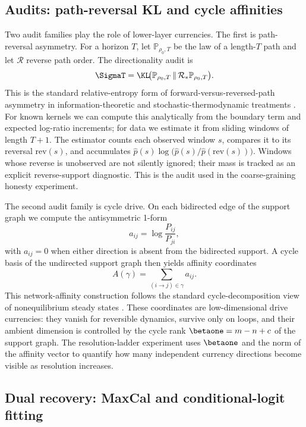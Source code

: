 \subsection{Audits: path-reversal KL and cycle affinities}

Two audit families play the role of lower-layer currencies. The first is path-reversal asymmetry. For a horizon \(T\), let \(\mathbb{P}_{\rho_0,T}\) be the law of a length-\(T\) path and let \(\mathcal R\) reverse path order. The directionality audit is
\[
\SigmaT = \KL\!\big(\mathbb{P}_{\rho_0,T}\,\|\,\mathcal R_*\mathbb{P}_{\rho_0,T}\big).
\]
This is the standard relative-entropy form of forward-versus-reversed-path asymmetry in information-theoretic and stochastic-thermodynamic treatments \cite{kullback1951information,lebowitz1999gallavotti,seifert2005entropy}.
For known kernels we can compute this analytically from the boundary term and expected log-ratio increments; for data we estimate it from sliding windows of length \(T+1\). The estimator counts each observed window \(s\), compares it to its reversal \(\mathrm{rev}(s)\), and accumulates \(\hat p(s)\log\!\big(\hat p(s)/\hat p(\mathrm{rev}(s))\big)\). Windows whose reverse is unobserved are not silently ignored; their mass is tracked as an explicit reverse-support diagnostic. This is the audit used in the coarse-graining honesty experiment.

The second audit family is cycle drive. On each bidirected edge of the support graph we compute the antisymmetric 1-form
\[
a_{ij}=\log\frac{P_{ij}}{P_{ji}},
\]
with \(a_{ij}=0\) when either direction is absent from the bidirected support. A cycle basis of the undirected support graph then yields affinity coordinates
\[
A(\gamma)=\sum_{(i\to j)\in \gamma} a_{ij}.
\]
This network-affinity construction follows the standard cycle-decomposition view of nonequilibrium steady states \cite{schnakenberg1976network,esposito2010threefaces}.
These coordinates are low-dimensional drive currencies: they vanish for reversible dynamics, survive only on loops, and their ambient dimension is controlled by the cycle rank \(\betaone = m-n+c\) of the support graph. The resolution-ladder experiment uses \(\betaone\) and the norm of the affinity vector to quantify how many independent currency directions become visible as resolution increases.

\subsection{Dual recovery: MaxCal and conditional-logit fitting}

